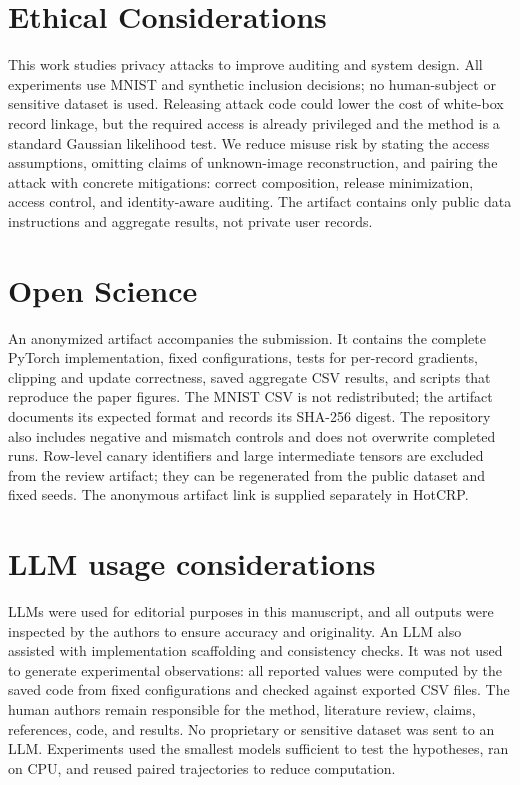 \documentclass[conference]{IEEEtran}
\begin{document}
\section*{Ethical Considerations}

This work studies privacy attacks to improve auditing and system design. All experiments use MNIST and synthetic inclusion decisions; no human-subject or sensitive dataset is used. Releasing attack code could lower the cost of white-box record linkage, but the required access is already privileged and the method is a standard Gaussian likelihood test. We reduce misuse risk by stating the access assumptions, omitting claims of unknown-image reconstruction, and pairing the attack with concrete mitigations: correct composition, release minimization, access control, and identity-aware auditing. The artifact contains only public data instructions and aggregate results, not private user records.

\section*{Open Science}

An anonymized artifact accompanies the submission. It contains the complete PyTorch implementation, fixed configurations, tests for per-record gradients, clipping and update correctness, saved aggregate CSV results, and scripts that reproduce the paper figures. The MNIST CSV is not redistributed; the artifact documents its expected format and records its SHA-256 digest. The repository also includes negative and mismatch controls and does not overwrite completed runs. Row-level canary identifiers and large intermediate tensors are excluded from the review artifact; they can be regenerated from the public dataset and fixed seeds. The anonymous artifact link is supplied separately in HotCRP.

\section*{LLM usage considerations}

LLMs were used for editorial purposes in this manuscript, and all outputs were inspected by the authors to ensure accuracy and originality. An LLM also assisted with implementation scaffolding and consistency checks. It was not used to generate experimental observations: all reported values were computed by the saved code from fixed configurations and checked against exported CSV files. The human authors remain responsible for the method, literature review, claims, references, code, and results. No proprietary or sensitive dataset was sent to an LLM. Experiments used the smallest models sufficient to test the hypotheses, ran on CPU, and reused paired trajectories to reduce computation.
\end{document}
